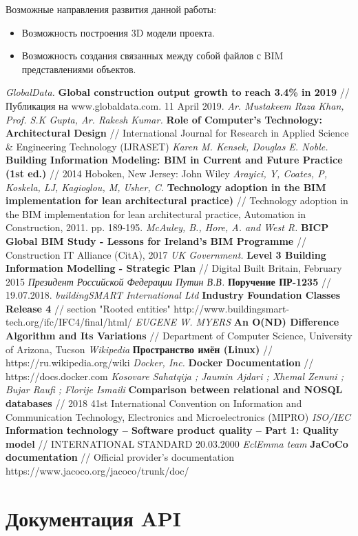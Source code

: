 \documentclass[a4paper,14pt]{extreport} %
\begin{document}
Возможные направления развития данной работы:
\begin{itemize}
\item Возможность построения 3D модели проекта.
\item Возможность создания связанных между собой файлов с BIM представлениями объектов.
\end{itemize}

\begin{thebibliography}{1}
{\small
{} {\it GlobalData.}
\textbf{Global construction output growth to reach 3.4\% in 2019} // Публикация на www.globaldata.com. 11 April 2019.
 \textit{Ar. Mustakeem Raza Khan, Prof. S.K Gupta, Ar. Rakesh Kumar.}
\textbf{Role of Computer’s Technology: Architectural Design} // International Journal for Research in Applied Science \& Engineering Technology (IJRASET)
 {\it Karen M. Kensek, Douglas E. Noble.}
\textbf{Building Information Modeling: BIM in Current and Future Practice (1st ed.)} // 2014 Hoboken, New Jersey: John Wiley
 {\it Arayici, Y, Coates, P, Koskela, LJ, Kagioglou, M, Usher, C.}
\textbf{Technology adoption in the BIM implementation for lean architectural practice)} // Technology adoption in the BIM implementation for lean architectural practice, Automation in Construction, 2011. pp. 189-195.
 {\it McAuley, B., Hore, A. and West R.}
\textbf{BICP Global BIM Study - Lessons for Ireland’s BIM Programme} // Construction IT Alliance (CitA), 2017
 {\it UK Government.}
\textbf{Level 3 Building Information Modelling - Strategic Plan} // Digital Built Britain, February 2015
 {\it Президент Российской Федерации Путин В.В.}
\textbf{Поручение ПР-1235} // 19.07.2018.
 {\it buildingSMART International Ltd}
\textbf{Industry Foundation Classes Release 4} // section "Rooted entities" \hspace{0.5cm} http://www.buildingsmart-tech.org/ifc/IFC4/final/html/
 {\it EUGENE W. MYERS}
\textbf{An O(ND) Difference Algorithm and Its Variations} // Department of Computer Science, University of Arizona, Tucson
 {\it Wikipedia}
\textbf{Пространство имён (Linux)} // https://ru.wikipedia.org/wiki
 {\it Docker, Inc.}
\textbf{Docker Documentation} //  https://docs.docker.com
 {\it Kosovare Sahatqija ; Jaumin Ajdari ; Xhemal Zenuni ; Bujar Raufi ; Florije Ismaili}
\textbf{Comparison between relational and NOSQL databases} // 2018 41st International Convention on Information and Communication Technology, Electronics and Microelectronics (MIPRO)
 {\it ISO/IEC}
\textbf{Information technology -- Software product quality -- Part 1: Quality model} // INTERNATIONAL STANDARD 20.03.2000
 {\it EclEmma team}
\textbf{JaCoCo documentation} // Official provider's documentation https://www.jacoco.org/jacoco/trunk/doc/
}
\end{thebibliography}

\appendix
\chapter{Документация API}

\end{document}
